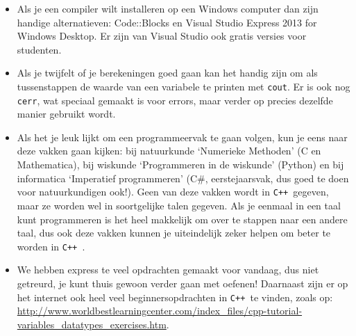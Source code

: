 \documentclass[12pt,a4paper]{article}
\newcommand{\icode}{\lstinline}
\newcommand{\mono}{\texttt}
\newcommand{\cpp}{\mono{C++ }}
\begin{document}
\begin{itemize}
\begin{enumerate}
	\end{enumerate}
	\item Als je een compiler wilt installeren op een Windows computer dan zijn handige alternatieven: Code::Blocks en Visual Studio Express 2013 for Windows Desktop. Er zijn van Visual Studio ook gratis versies voor studenten.
	\item Als je twijfelt of je berekeningen goed gaan kan het handig zijn om als tussenstappen de waarde van een variabele te printen met \icode{cout}. Er is ook nog \icode{cerr}, wat speciaal gemaakt is voor errors, maar verder op precies dezelfde manier gebruikt wordt.
	\item Als het je leuk lijkt om een programmeervak te gaan volgen, kun je eens naar deze vakken gaan kijken: bij natuurkunde `Numerieke Methoden' (C en Mathematica), bij wiskunde `Programmeren in de wiskunde' (Python) en bij informatica `Imperatief programmeren' (C\#, eerstejaarsvak, dus goed te doen voor natuurkundigen ook!). Geen van deze vakken wordt in \cpp gegeven, maar ze worden wel in soortgelijke talen gegeven. Als je eenmaal in een taal kunt programmeren is het heel makkelijk om over te stappen naar een andere taal, dus ook deze vakken kunnen je uiteindelijk zeker helpen om beter te worden in \cpp. 
	\item We hebben express te veel opdrachten gemaakt voor vandaag, dus niet getreurd, je kunt thuis gewoon verder gaan met oefenen! Daarnaast zijn er op het internet ook heel veel beginnersopdrachten in \cpp te vinden, zoals op: \url{http://www.worldbestlearningcenter.com/index_files/cpp-tutorial-variables_datatypes_exercises.htm}.
\end{itemize}
\end{document}
